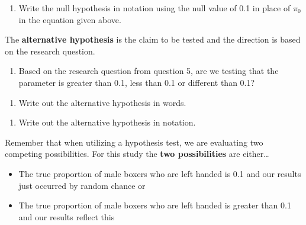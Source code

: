 \documentclass[
]{report}
\providecommand{\tightlist}{%
  \setlength{\itemsep}{0pt}\setlength{\parskip}{0pt}}
\begin{document}
\begin{enumerate}
\def\labelenumi{\arabic{enumi}.}
\setcounter{enumi}{9}
\tightlist
\item
  Write the null hypothesis in notation using the null value of 0.1 in place of \(\pi_0\) in the equation given above.
\end{enumerate}

\vspace{0.5in}

The \textbf{alternative hypothesis} is the claim to be tested and the direction is based on the research question.

\begin{enumerate}
\def\labelenumi{\arabic{enumi}.}
\setcounter{enumi}{10}
\tightlist
\item
  Based on the research question from question 5, are we testing that the parameter is greater than 0.1, less than 0.1 or different than 0.1?
\end{enumerate}

\vspace{0.5in}

\begin{enumerate}
\def\labelenumi{\arabic{enumi}.}
\setcounter{enumi}{11}
\tightlist
\item
  Write out the alternative hypothesis in words.
\end{enumerate}

\vspace{1in}

\begin{enumerate}
\def\labelenumi{\arabic{enumi}.}
\setcounter{enumi}{12}
\tightlist
\item
  Write out the alternative hypothesis in notation.
\end{enumerate}

\vspace{0.5in}

Remember that when utilizing a hypothesis test, we are evaluating two competing possibilities. For this study the \textbf{two possibilities} are either\ldots{}

\begin{itemize}
\item
  The true proportion of male boxers who are left handed is 0.1 and our results just occurred by random chance or
\item
  The true proportion of male boxers who are left handed is greater than 0.1 and our results reflect this
\end{itemize}
\end{document}

